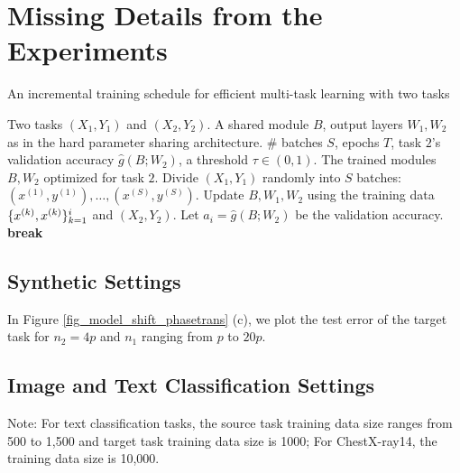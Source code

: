 \section{Missing Details from the Experiments}\label{app_experiments}


\begin{algorithm}[!t]
	\caption{An incremental training schedule for efficient multi-task learning with two tasks}
	\label{alg_inc_train}
	\begin{algorithmic}[1]
		\Input Two tasks $(X_1, Y_1)$ and $(X_2, Y_2)$.
		\Param A shared module $B$, output layers $W_1, W_2$ as in the hard parameter sharing architecture.
		\Req \# batches $S$, epochs $T$, task $2$'s validation accuracy $\hat{g}(B; W_2)$, a threshold $\tau\in(0,1)$.
		\Output The trained modules $B, W_2$ optimized for task $2$.
		\State Divide $(X_1, Y_1)$ randomly into $S$ batches: $(x^{(1)}, y^{(1)}), \dots, (x^{(S)}, y^{(S)})$.
				\State Update $B, W_1, W_2$ using the training data $\{x^{(k)}, x^{(k)}\}_{k=1}^i$ and  $(X_2, Y_2)$.
			\EndFor
			\State Let $a_i = \hat{g}(B; W_2)$ be the validation accuracy.
				\State \textbf{break}
			\EndIf
		\EndFor
	\end{algorithmic}
\end{algorithm}


\subsection{Synthetic Settings}\label{app_synthetic}
	In Figure \ref{fig_model_shift_phasetrans} (c), we plot the test error of the target task for $n_2 = 4p$ and $n_1$ ranging from $p$ to $20p$.

\subsection{Image and Text Classification Settings}\label{app_it}

Note: For text classification tasks, the source task training data size ranges from 500 to 1,500 and target task training data size is 1000; For ChestX-ray14, the training data size is 10,000.


